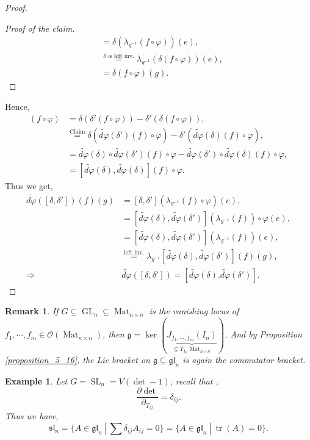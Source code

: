 \documentclass[10pt]{article}
\newtheorem{remark}{Remark}[section]
\newtheorem{example}{Example}[section]
\numberwithin{equation}{theorem}
\DeclareMathOperator{\tr}{tr}
\DeclareMathOperator{\GL}{GL}
\DeclareMathOperator{\SL}{SL}
\DeclareMathOperator{\Ker}{ker}
\DeclareMathOperator{\Mat}{Mat}
\newcommand{\Ouv}[0]{\mathcal{O}}
\newcommand{\g}[0]{\mathfrak{g}}
\newcommand{\gl}[0]{\mathfrak{gl}}
\newcommand{\spl}[0]{\mathfrak{sl}}
\newcommand{\sep}[0]{\:|\:}
\begin{document}
\begin{proof}
\begin{proof}[Proof of the claim]
\begin{align*}
      & = \delta(\lambda_{g^{-1}}(f\circ\varphi))(e),\\
      & \stackrel{\text{$\delta$ is left inv.}}{=} \lambda_{g^{-1}}(\delta(f\circ\varphi))(e),\\
      & = \delta(f\circ \varphi)(g).
    \end{align*}
  \end{proof}
  Hence,
  \begin{align*}
    [\delta,\delta'](f\circ\varphi) & = \delta(\delta'(f\circ \varphi))-\delta'(\delta(f\circ\varphi)),\\
    & \stackrel{\text{Claim}}{=} \delta(\tilde{d\varphi}(\delta')(f)\circ\varphi)-\delta'(\tilde{d\varphi}(\delta)(f)\circ\varphi),\\
    & = \tilde{d\varphi}(\delta)\circ\tilde{d\varphi}(\delta')(f)\circ\varphi - \tilde{d\varphi}(\delta')\circ\tilde{d\varphi}(\delta)(f)\circ\varphi,\\
    & = [\tilde{d\varphi}(\delta),\tilde{d\varphi}(\delta)](f)\circ\varphi.
  \end{align*}
  Thus we get,
  \begin{align*}
    \tilde{d\varphi}([\delta,\delta'])(f)(g) & = [\delta,\delta'](\lambda_{g^{-1}}(f)\circ\varphi)(e),\\
    & = [\tilde{d\varphi}(\delta),\tilde{d\varphi}(\delta')](\lambda_{g^{-1}}(f))\circ\varphi(e),\\
    & = [\tilde{d\varphi}(\delta),\tilde{d\varphi}(\delta')](\lambda_{g^{-1}}(f))(e),\\
    &\stackrel{\text{left inv.}}{=}\lambda_{g^{-1}}[\tilde{d\varphi}(\delta),\tilde{d\varphi}(\delta')](f)(g),\\
    \Rightarrow & \tilde{d\varphi}([\delta,\delta']) = [\tilde{d\varphi}(\delta).\tilde{d\varphi}(\delta')].
  \end{align*}
\end{proof}

\begin{remark}
  If $G\subseteq\GL_n\subseteq\Mat_{n\times n}$ is the vanishing locus of $f_1,\cdots,f_m\in\Ouv(\Mat_{n\times n})$, then $\g = \Ker (\underbrace{J_{f_1,\cdots,f_m}(I_n)}_{\subseteq T_{I_n}\Mat_{n\times n}})$. And by Proposition \ref{proposition_5_16}, the Lie bracket on $\g\subseteq\gl_n$ is again the commutator bracket.
\end{remark}

\begin{example}
  \label{example_5_12}
  Let $G=\SL_n=V(\det-1)$, recall that ,
  \begin{equation*}
    {\frac {\partial \det} {\partial_{T_{ij}}}} = \delta_{ij}.
  \end{equation*}
  Thus we have,
  \begin{equation*}
    \spl_n=\{A\in\gl_n\sep \sum\delta_{ij}A_{ij} = 0\} = \{A\in\gl_n\sep \tr(A) = 0\}.
  \end{equation*}
\end{example}
\end{document}

